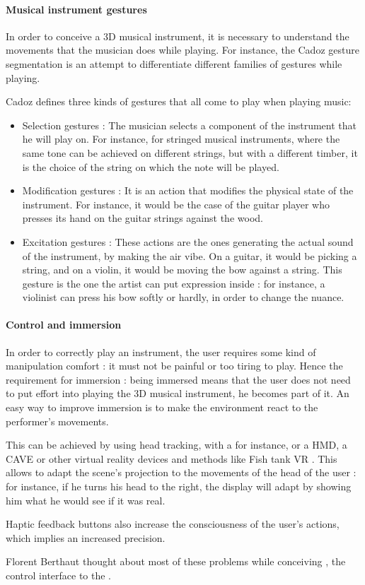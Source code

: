 \paragraph{Musical instrument gestures}
In order to conceive a 3D musical instrument, it is necessary to understand the movements that the musician does while playing. For instance, the Cadoz gesture segmentation \cite{cadoz1999musique} is an attempt to differentiate different families of gestures while playing.

Cadoz defines three kinds of gestures that all come to play when playing music:

\begin{itemize}
\item Selection gestures : The musician selects a component of the instrument that he will play on. For instance, for stringed musical instruments, where the same tone can be achieved on different strings, but with a different timber, it is the choice of the string on which the note will be played.
\item Modification gestures : It is an action that modifies the physical state of the instrument. For instance, it would be the case of the guitar player who presses its hand on the guitar strings against the wood. 
\item Excitation gestures : These actions are the ones generating the actual sound of the instrument, by making the air vibe. On a guitar, it would be picking a string, and on a violin, it would be moving the bow against a string. This gesture is the one the artist can put expression inside : for instance, a violinist can press his bow softly or hardly, in order to change the nuance.
\end{itemize}

\paragraph{Control and immersion}
In order to correctly play an instrument, the user requires some kind of manipulation comfort : it must not be painful or too tiring to play. 
Hence the requirement for immersion : being immersed means that the user does not need to put effort into playing the 3D musical instrument, he becomes part of it.
An easy way to improve immersion is to make the environment react to the performer's movements. 

This can be achieved by using head tracking, with a  for instance, or a \ac{HMD}, a \ac{CAVE} or other virtual reality devices and methods like Fish tank VR \cite{robertson1997immersion}. This allows to adapt the scene's projection to the movements of the head of the user : for instance, if he turns his head to the right, the display will adapt by showing him what he would see if it was real.

Haptic feedback buttons also increase the consciousness of the user's actions, which implies an increased precision.

Florent Berthaut thought about most of these problems while conceiving  \cite{berthaut2010piivert}, the control interface to the .
